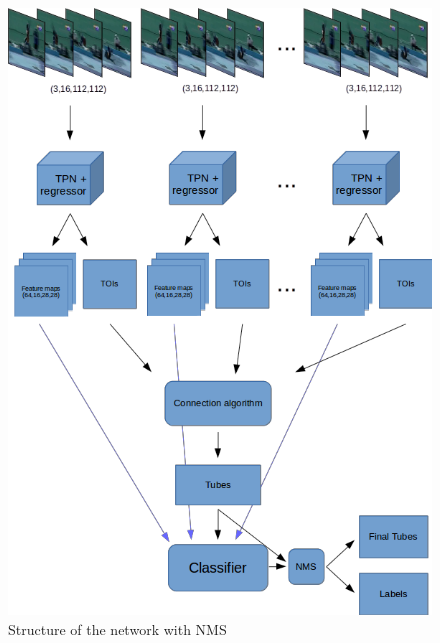 \documentclass{report}
\begin{document}
\begin{figure}[h]
  \centering
  \includegraphics[scale=0.7]{model_nms}
  \caption{Structure of the network with NMS}
  \label{fig:network_nms}
\end{figure}
\end{document}
